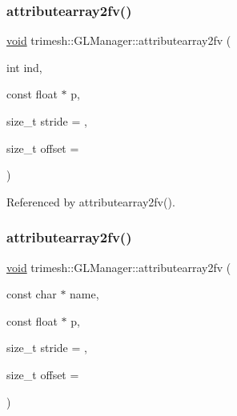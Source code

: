 \subsubsection{\texorpdfstring{attributearray2fv()}{attributearray2fv()}\hspace{0.1cm}{\footnotesize\ttfamily [1/6]}}
{\footnotesize\ttfamily \hyperlink{namespacetrimesh_a784ddfd979e1c579bda795a8edfc3f43}{void} trimesh\+::\+G\+L\+Manager\+::attributearray2fv (\begin{DoxyParamCaption}\item[{int}]{ind,  }\item[{const float $\ast$}]{p,  }\item[{size\+\_\+t}]{stride = {},  }\item[{size\+\_\+t}]{offset = {} }\end{DoxyParamCaption})\hspace{0.3cm}{\ttfamily [inline]}}



Referenced by attributearray2fv().

\mbox{\label{classtrimesh_1_1GLManager_a08b8a9cb14528ea00466259eb84e0595}} 
\subsubsection{\texorpdfstring{attributearray2fv()}{attributearray2fv()}\hspace{0.1cm}{\footnotesize\ttfamily [2/6]}}
{\footnotesize\ttfamily \hyperlink{namespacetrimesh_a784ddfd979e1c579bda795a8edfc3f43}{void} trimesh\+::\+G\+L\+Manager\+::attributearray2fv (\begin{DoxyParamCaption}\item[{const char $\ast$}]{name,  }\item[{const float $\ast$}]{p,  }\item[{size\+\_\+t}]{stride = {},  }\item[{size\+\_\+t}]{offset = {} }\end{DoxyParamCaption})\hspace{0.3cm}{\ttfamily [inline]}}

\mbox{\label{classtrimesh_1_1GLManager_ab9f9aa4baa8e7a746b04082132a26a50}} 
